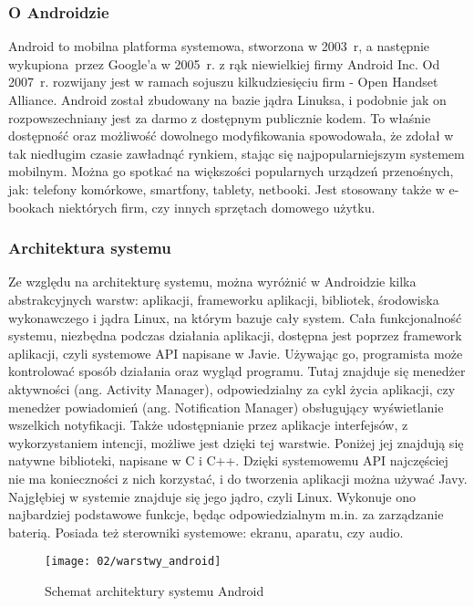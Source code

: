 \subsubsection*{O Androidzie}

Android to mobilna platforma systemowa, stworzona w 2003~r, a następnie wykupiona przez Google'a w 2005~r. z rąk niewielkiej firmy Android Inc. Od 2007~r. rozwijany jest w ramach sojuszu kilkudziesięciu firm - Open Handset Alliance. Android został zbudowany na bazie jądra Linuksa, i podobnie jak on rozpowszechniany jest za darmo z dostępnym publicznie kodem. To właśnie dostępność oraz możliwość dowolnego modyfikowania spowodowała, że zdołał w tak niedługim czasie zawładnąć rynkiem, stając się najpopularniejszym systemem mobilnym. Można go spotkać na większości popularnych urządzeń przenośnych, jak: telefony komórkowe, smartfony, tablety, netbooki. Jest stosowany także w e-bookach niektórych firm, czy innych sprzętach domowego użytku. 


\subsubsection*{Architektura systemu}
Ze względu na architekturę systemu, można wyróżnić w Androidzie kilka abstrakcyjnych warstw: aplikacji, frameworku aplikacji, bibliotek, środowiska wykonawczego i jądra Linux, na którym bazuje cały system. Cała funkcjonalność systemu, niezbędna podczas działania aplikacji, dostępna jest poprzez framework aplikacji, czyli systemowe API napisane w Javie. Używając go, programista może kontrolować sposób działania oraz wygląd programu. Tutaj znajduje się menedżer aktywności (ang. Activity Manager), odpowiedzialny za cykl życia aplikacji, czy menedżer powiadomień (ang. Notification Manager) obsługujący wyświetlanie wszelkich notyfikacji. Także udostępnianie przez aplikacje interfejsów, z wykorzystaniem intencji, możliwe jest dzięki tej warstwie. Poniżej jej znajdują się natywne biblioteki, napisane w C i C++. Dzięki systemowemu API najczęściej nie ma konieczności z nich korzystać, i do tworzenia aplikacji można używać Javy. Najgłębiej w systemie znajduje się jego jądro, czyli Linux. Wykonuje ono najbardziej podstawowe funkcje, będąc odpowiedzialnym m.in. za zarządzanie baterią. Posiada też sterowniki systemowe: ekranu, aparatu, czy audio.
\begin{figure}[h]
	\begin{center}
		\texttt{[image: 02/warstwy\_android]}
	\end{center}
	\caption{Schemat architektury systemu Android}
\end{figure}
